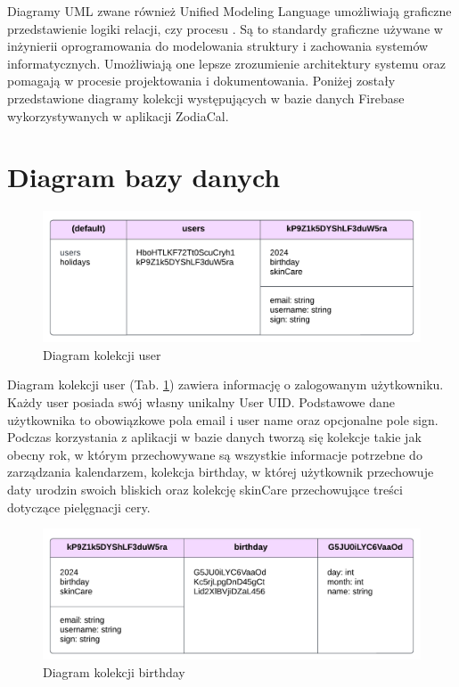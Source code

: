 Diagramy UML zwane również Unified Modeling Language umożliwiają graficzne przedstawienie logiki relacji, czy procesu \cite{diagram}. Są to standardy graficzne używane w inżynierii oprogramowania do modelowania struktury i zachowania systemów informatycznych. Umożliwiają one lepsze zrozumienie architektury systemu oraz pomagają w procesie projektowania i dokumentowania. Poniżej zostały przedstawione diagramy kolekcji występujących w bazie danych Firebase wykorzystywanych w aplikacji ZodiaCal.

\section*{Diagram bazy danych}

\begin{figure}[h]
	\centering
	\includegraphics[width=1\linewidth]{images/model_danych/user}
	\caption{Diagram kolekcji user}
	\label{fig:user}
\end{figure}

Diagram kolekcji user (Tab. \ref{fig:user}) zawiera informację o zalogowanym użytkowniku. Każdy user posiada swój własny unikalny User UID. Podstawowe dane użytkownika to obowiązkowe pola email i user name oraz opcjonalne pole sign. Podczas korzystania z aplikacji w bazie danych tworzą się kolekcje takie jak obecny rok, w którym przechowywane są wszystkie informacje potrzebne do zarządzania kalendarzem, kolekcja birthday, w której użytkownik przechowuje daty urodzin swoich bliskich oraz kolekcję skinCare przechowujące treści dotyczące pielęgnacji cery.

\newpage

\begin{figure}[h]
	\centering
	\includegraphics[width=1\linewidth]{images/model_danych/birthday}
	\caption{Diagram kolekcji birthday}
	\label{fig:birthday}
\end{figure}

